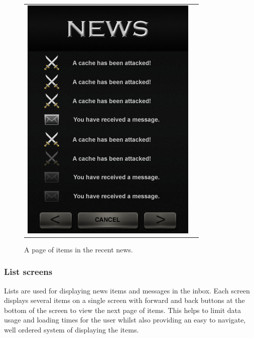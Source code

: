 \begin{figure}[h!]
\begin{tabular}{cc}
\begin{minipage}{0.3\textwidth}
\begin{center}
\begin{minipage}{0.83\textwidth}
		\includegraphics[width=\textwidth]{images/news_mockup}
	\caption{A page of items in the recent news.}
		\end{minipage}
		\end{center}
	\end{minipage}
\end{tabular}
\vspace{-0pt}
\end{figure}

\subsubsection{List screens}

Lists are used for displaying news items and messages in the inbox. Each screen displays several items on a single screen with forward and back buttons at the bottom of the screen to view the next page of items. This helps to limit data usage and loading times for the user whilst also providing an easy to navigate, well ordered system of displaying the items.

